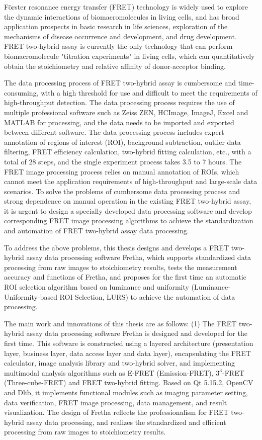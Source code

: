 \begin{eabstract}

Förster resonance energy transfer (FRET) technology is widely used to explore the dynamic interactions of biomacromolecules in living cells, and has broad application prospects in basic research in life sciences, exploration of the mechanisms of disease occurrence and development, and drug development.
FRET two-hybrid assay is currently the only technology that can perform biomacromolecule "titration experiments" in living cells, which can quantitatively obtain the stoichiometry and relative affinity of donor-acceptor binding.

The data processing process of FRET two-hybrid assay is cumbersome and time-consuming, with a high threshold for use and difficult to meet the requirements of high-throughput detection.
The data processing process requires the use of multiple professional software such as Zeiss ZEN, HCImage, ImageJ, Excel and MATLAB for processing, and the data needs to be imported and exported between different software.
The data processing process includes expert annotation of regions of interest (ROI), background subtraction, outlier data filtering, FRET efficiency calculation, two-hybrid fitting calculation, etc., with a total of 28 steps, and the single experiment process takes 3.5 to 7 hours.
The FRET image processing process relies on manual annotation of ROIs, which cannot meet the application requirements of high-throughput and large-scale data scenarios.
To solve the problems of cumbersome data processing process and strong dependence on manual operation in the existing FRET two-hybrid assay, it is urgent to design a specially developed data processing software and develop corresponding FRET image processing algorithms to achieve the standardization and automation of FRET two-hybrid assay data processing.

To address the above problems, this thesis designs and develops a FRET two-hybrid assay data processing software Fretha, which supports standardized data processing from raw images to stoichiometry results, tests the measurement accuracy and functions of Fretha, and proposes for the first time an automatic ROI selection algorithm based on luminance and uniformity (Luminance-Uniformity-based ROI Selection, LURS) to achieve the automation of data processing.

The main work and innovations of this thesis are as follows:
(1) The FRET two-hybrid assay data processing software Fretha is designed and developed for the first time.
This software is constructed using a layered architecture (presentation layer, business layer, data access layer and data layer), encapsulating the FRET calculator, image analysis library and two-hybrid solver, and implementing multimodal analysis algorithms such as E-FRET (Emission-FRET), $3^3$-FRET (Three-cube-FRET) and FRET two-hybrid fitting.
Based on Qt 5.15.2, OpenCV and Dlib, it implements functional modules such as imaging parameter setting, data verification, FRET image processing, data management, and result visualization.
The design of Fretha reflects the professionalism for FRET two-hybrid assay data processing, and realizes the standardized and efficient processing from raw images to stoichiometry results.


\end{eabstract}
